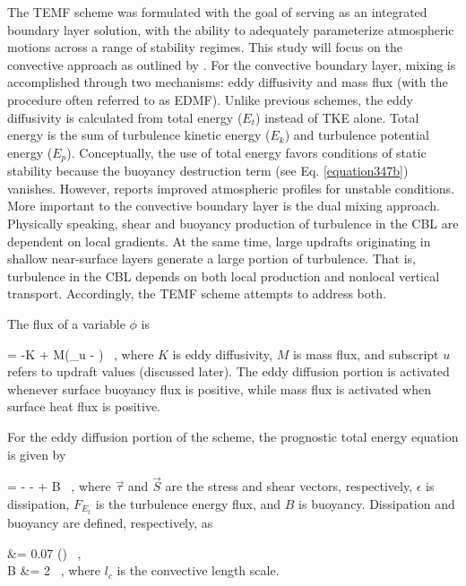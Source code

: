 The TEMF scheme was formulated with the goal of serving as an integrated boundary layer solution, with the ability to adequately parameterize atmospheric motions across a range of stability regimes. This study will focus on the convective approach as outlined by  \citet{Angevine2010}. For the convective boundary layer, mixing is accomplished through two mechanisms: eddy diffusivity and mass flux (with the procedure often referred to as EDMF). Unlike previous schemes, the eddy diffusivity is calculated from total energy ($E_t$) instead of TKE alone. Total energy is the sum of turbulence kinetic energy ($E_k$) and turbulence potential energy ($E_p$). Conceptually, the use of total energy favors conditions of static stability because the buoyancy destruction term (see Eq. \autoref{equation347b}) vanishes. However,  \citet{Angevine2010} reports improved atmospheric profiles for unstable conditions.
More important to the convective boundary layer is the dual mixing approach. Physically speaking, shear and buoyancy production of turbulence in the CBL are dependent on local gradients. At the same time, large updrafts originating in shallow near-surface layers generate a large portion of turbulence. That is, turbulence in the CBL depends on both local production and nonlocal vertical transport. Accordingly, the TEMF scheme attempts to address both. 

The flux of a variable $\phi$ is

\be 
{} = -K + M(\phi_u - \phi) \mbox{ ,} \label{equation356}
\ee
\noindent
 where $K$ is eddy diffusivity, $M$ is mass flux, and subscript $u$ refers to updraft values (discussed later). The eddy diffusion portion is activated whenever surface buoyancy flux is positive, while mass flux is activated when surface heat flux is positive. 

For the eddy diffusion portion of the scheme, the prognostic total energy equation is given by

\be
{} = \vec{\tau} \cdot {} - \epsilon -  + B \mbox { ,} \label{equation357}
\ee
\noindent
 where $\vec{\tau}$ and $\vec{S}$ are the stress and shear vectors, respectively, $\epsilon$ is dissipation, $F_{E_t}$ is the turbulence energy flux, and $B$ is buoyancy. Dissipation and buoyancy are defined, respectively, as

\bse \label{equation358}
\bal
\epsilon &= 0.07 \left(\right) \mbox{ ,} \label{equation358a} \\
B &= 2  \label{equation358b} \mbox{ ,}
\eal
\ese
\noindent
 where $l_c$ is the convective length scale.

